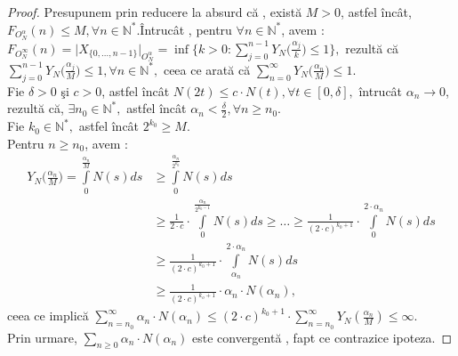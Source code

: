 \documentclass[ a4paper, 12pt]{report}
\theoremstyle{remark}
\numberwithin{equation}{section}
\begin{document}
\begin{proof}
Presupunem prin reducere la absurd c\u a , exist\u a $M > 0$, astfel \^inc\^at, $F_{O_{N}^{\alpha}}(n) \leq M, \forall n \in \mathbb{N}^{\ast}.$\^Intruc\^at , pentru $\forall n \in \mathbb{N}^{\ast}$, avem :\\ $F_{O_{N}^{\infty}}(n) = \lvert X_{\{0,\ldots,n-1 \}} \rvert_{O_{N}^{\alpha}} = \inf\{ k>0 : \sum\limits_{j=0}^{n-1} Y_N \Big(\frac{\alpha_j}{k}\Big) \leq 1\} ,$ rezult\u a c\u a  $ \sum\limits_{j=0}^{n-1} Y_N\Big(\frac{\alpha_j}{M}\Big) \leq 1, \forall n \in \mathbb{N}^{\ast},$ ceea ce arat\u a c\u a $\sum\limits_{n=0}^{\infty}Y_N\Big(\frac{\alpha_n}{M}\Big) \leq 1.$ \\
Fie $\delta>0$ \c si $c > 0$, astfel \^inc\^at $N(2t) \leq c \cdot N(t), \forall t \in [0,\delta],$ \^intruc\^at $\alpha_n \longrightarrow 0$, rezult\u a c\u a, $\exists n_0 \in \mathbb{N}^{\ast},$ astfel \^inc\^at $\alpha_n < \frac{\delta}{2}, \forall n \geq n_0.$\\
Fie $k_0 \in \mathbb{N}^{\ast},$ astfel \^inc\^at $2^{k_{0}} \geq M.$ \\
Pentru $n \geq n_0$, avem :
\begin{align*}
Y_N\Big(\frac{\alpha_n}{M}\Big) = \int\limits_0^{\frac{\alpha_n}{M}} N(s)ds&\geq\int\limits_0^{\frac{\alpha_n}{2^{k_{0}}}} N(s) ds\\
 &\geq \frac{1}{2 \cdot c}\cdot \int\limits_{0}^{\frac{\alpha_n}{2^{k_{0}-1}}} N(s)ds\geq \ldots \geq \frac{1}{(2 \cdot c)^{k_{0}+1}} \cdot \int\limits_{0}^{2 \cdot \alpha_n} N(s)ds\\
   &\geq \frac{1}{(2 \cdot c)^{k_{0}+1}} \cdot \int\limits_{\alpha_n}^{2 \cdot \alpha_n}N(s)ds\\
   &\geq \frac{1}{(2 \cdot c)^{k_{o}+1}} \cdot \alpha_n \cdot N(\alpha_n),
\end{align*} ceea ce implic\u a  $\sum\limits_{n=n_0}^{\infty} \alpha_n \cdot N(\alpha_n) \leq (2 \cdot c)^{k_{0}+1} \cdot \sum\limits_{n=n_0}^{\infty} Y_N(\frac{\alpha_n}{M}) \leq \infty.$\\
Prin urmare, $\sum\limits_{n \geq 0} \alpha_n \cdot N(\alpha_n)$ este convergent\u a , fapt ce contrazice ipoteza.
\end{proof}
\end{document}
